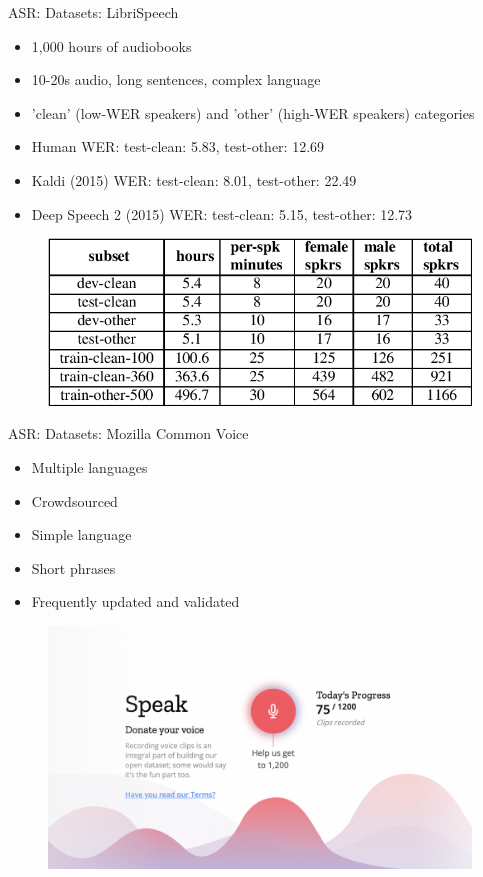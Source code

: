 \begin{frame}{ASR: Datasets: LibriSpeech}
\begin{itemize}
    \item 1,000 hours of audiobooks
    \item 10-20s audio, long sentences, complex language
    \item ’clean’ (low-WER speakers) and ’other’ (high-WER speakers) categories
    \item Human WER: test-clean: 5.83, test-other: 12.69
    \item Kaldi (2015) WER: test-clean:  8.01, test-other: 22.49
    \item  Deep Speech 2 (2015) WER: test-clean:  5.15, test-other: 12.73


\end{itemize}
    \begin{figure}
    	\centering
    	\includegraphics[width=0.8\linewidth]{figs/librispeech.png}
    \end{figure}


    
\end{frame}
\begin{frame}{ASR: Datasets: Mozilla Common Voice}
\begin{itemize}
    \item Multiple languages
    \item Crowdsourced
    \item Simple language
    \item Short phrases
    \item Frequently updated and validated

\end{itemize}
    \begin{figure}
    	\centering
    	\includegraphics[width=0.8\linewidth]{figs/mozilla.png}
    \end{figure}


\end{frame}

